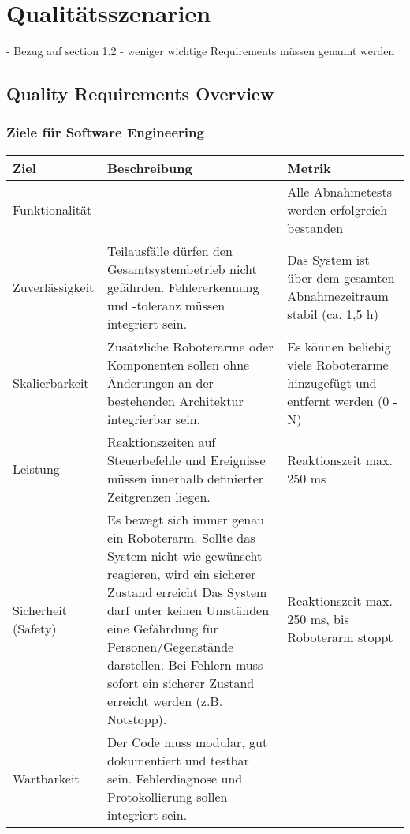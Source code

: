 \chapter{Qualitätsszenarien}
- Bezug auf section 1.2 
- weniger wichtige Requirements müssen genannt werden

\section{Quality Requirements Overview}



\subsection{Ziele für Software Engineering}
\begin{table}[h!]
	\centering
	\begin{tabular}{p{4cm}|p{5cm}|p{5cm}|}
		\hline
		\textbf{Ziel} & \textbf{Beschreibung} & \textbf{Metrik} \\
		\hline
		Funktionalität &  
		& Alle Abnahmetests werden erfolgreich bestanden
		\\
		\hline
		Zuverlässigkeit & 
		Teilausfälle dürfen den Gesamtsystembetrieb nicht gefährden. Fehlererkennung und -toleranz müssen integriert sein.
		& Das System ist über dem gesamten Abnahmezeitraum stabil (ca. 1,5 h)
		\\
		\hline
		Skalierbarkeit & 
		Zusätzliche Roboterarme oder Komponenten sollen ohne Änderungen an der bestehenden Architektur integrierbar sein. 
		& Es können beliebig viele Roboterarme hinzugefügt und entfernt werden (0 - N)
		\\
		\hline
		Leistung & 
		Reaktionszeiten auf Steuerbefehle und Ereignisse müssen innerhalb definierter Zeitgrenzen liegen. 
		& Reaktionszeit max. 250 ms
		\\
		\hline
		Sicherheit (Safety) & 
		Es bewegt sich immer genau ein Roboterarm. Sollte das System nicht wie gewünscht reagieren, wird ein sicherer Zustand erreicht
		Das System darf unter keinen Umständen eine Gefährdung für Personen/Gegenstände darstellen. Bei Fehlern muss sofort ein sicherer Zustand erreicht werden (z.B. Notstopp). 
		& Reaktionszeit max. 250 ms, bis Roboterarm stoppt
		\\
		\hline
		Wartbarkeit & 
		Der Code muss modular, gut dokumentiert und testbar sein. Fehlerdiagnose und Protokollierung sollen integriert sein. 

\end{tabular}
\end{table}
